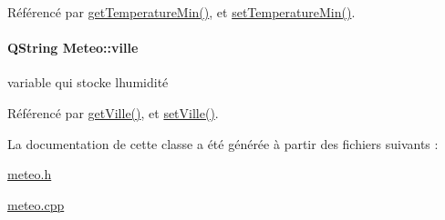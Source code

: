 Référencé par \hyperlink{class_meteo_a0cef4ff7ae16cfcd820d164d1c5334c4}{get\+Temperature\+Min()}, et \hyperlink{class_meteo_a7055da66033ec24def1e9f9688b837d1}{set\+Temperature\+Min()}.

\paragraph[{\texorpdfstring{ville}{ville}}]{\setlength{\rightskip}{0pt plus 5cm}Q\+String Meteo\+::ville\hspace{0.3cm}{\ttfamily [private]}}\hypertarget{class_meteo_a20ab84130cd8c6085e665f1d7d8403a6}{}\label{class_meteo_a20ab84130cd8c6085e665f1d7d8403a6}
variable qui stocke l\textquotesingle{}humidité 

Référencé par \hyperlink{class_meteo_af9ceb3e99e123e6931f8cd9cfde57834}{get\+Ville()}, et \hyperlink{class_meteo_ae6f56d33b87f62db4d6ebd88226d9e5f}{set\+Ville()}.



La documentation de cette classe a été générée à partir des fichiers suivants \+:\begin{DoxyCompactItemize}
\item 
\hyperlink{meteo_8h}{meteo.\+h}\item 
\hyperlink{meteo_8cpp}{meteo.\+cpp}\end{DoxyCompactItemize}
